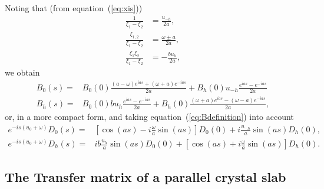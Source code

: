 \documentclass[preprint]{iucr}              %
\begin{document}
Noting that (from equation~(\ref{eq:xis}))
\begin{subequations}
\label{eq:xiidentities}
\begin{align}
\frac{1}{\xi_1-\xi_2}&=\frac{u_{-h}}{2a}, \nonumber \\
\frac{\xi_{1,2}}{\xi_1-\xi_2}&=\frac{\omega \pm a}{2a}, \nonumber \\
\frac{\xi_1 \xi_2}{\xi_1-\xi_2}&=-\frac{b u_h}{2a}, \nonumber
\end{align}
\end{subequations}
we obtain
\begin{subequations}
\label{eq:BSolutions}
\begin{align}
B_0(s) = &B_0(0) \frac{(a-\omega) e^{ias} + (\omega+a) e^{-ias}}{2a} + 
    B_h(0) u_{-h} \frac{e^{ias} - e^{-ias}}{2a} \\
B_h(s) = &B_0(0) b u_h \frac{e^{ias} - e^{-ias}}{2a} + 
    B_h(0) \frac{(\omega+a) e^{ias} - (\omega-a) e^{-ias}}{2a},
\end{align}
\end{subequations}
or, in a more compact form, and taking equation~(\ref{eq:Bdefinition}) into account
\begin{subequations}
\label{eq:DSolutionsCompact}
\begin{align}
e^{-is(u_0+\omega)} D_0(s) = & [\cos(as) - i\frac{\omega}{a}\sin(as)] D_0(0) +     i \frac{u_{-h}}{a}\sin(as) D_h(0), \\
e^{-is(u_0+\omega)} D_h(s) = & i b \frac{u_h}{a} \sin(as) D_0(0) + 
    [\cos(as) + i \frac{\omega}{a} \sin(as)] D_h(0).
\end{align}
\end{subequations}


\subsection{The Transfer matrix of a parallel crystal slab}
\label{sec:transferMatrix}
\end{document}
